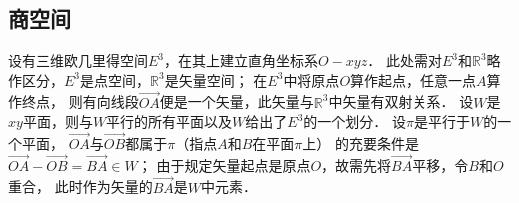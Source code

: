 

\subsection{商空间}\label{chmla:sec_quotient}

设有三维欧几里得空间$E^3$，在其上建立直角坐标系$O-xyz$．
此处需对$E^3$和$\mathbb{R}^3$略作区分，$E^3$是点空间，$\mathbb{R}^3$是矢量空间；
在$E^3$中将原点$O$算作起点，任意一点$A$算作终点，
则有向线段$\overrightarrow{OA}$便是一个矢量，此矢量与$\mathbb{R}^3$中矢量有双射关系．
设$W$是$xy$平面，则与$W$平行的所有平面以及$W$给出了$E^3$的一个划分．
设$\pi$是平行于$W$的一个平面，
$\overrightarrow{OA}$与$\overrightarrow{OB}$都属于$\pi$（指点$A$和$B$在平面$\pi$上）
的充要条件是$\overrightarrow{OA}-\overrightarrow{OB}=\overrightarrow{BA} \in W$；
由于规定矢量起点是原点$O$，故需先将$\overrightarrow{BA} $平移，令$B$和$O$重合，
此时作为矢量的$\overrightarrow{BA}$是$W$中元素．

